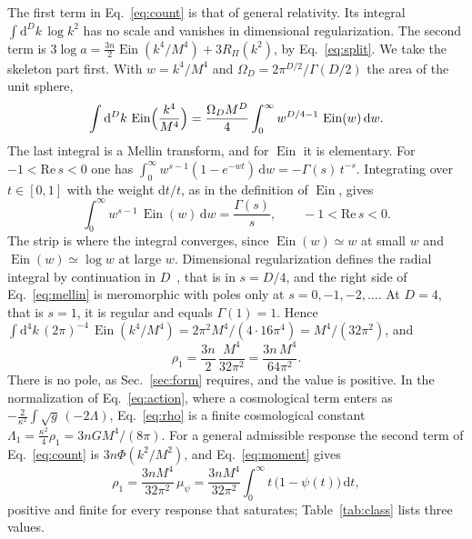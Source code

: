 \documentclass[a4paper,11pt]{article}
\newcommand{\dd}{\mathrm{d}}
\newcommand{\Ein}{\operatorname{Ein}}
\begin{document}
The first term in Eq.~\eqref{eq:count} is that of general relativity. Its integral $\int\dd^Dk\,\log k^2$ has no scale and vanishes in dimensional regularization. The second term is $3\log a=\frac{3n}2\Ein(k^4/M^4)+3R_\Pi(k^2)$, by Eq.~\eqref{eq:split}. We take the skeleton part first. With $w=k^4/M^4$ and $\Omega_D=2\pi^{D/2}/\Gamma(D/2)$ the area of the unit sphere,
\[
\int\dd^Dk\,\Ein\Bigl(\frac{k^4}{M^4}\Bigr)=\frac{\Omega_DM^D}4\int_0^\infty w^{D/4-1}\,\Ein(w)\,\dd w .
\]
The last integral is a Mellin transform, and for $\Ein$ it is elementary. For $-1<\mathrm{Re}\,s<0$ one has $\int_0^\infty w^{s-1}(1-e^{-wt})\,\dd w=-\Gamma(s)\,t^{-s}$. Integrating over $t\in[0,1]$ with the weight $\dd t/t$, as in the definition of $\Ein$, gives
\begin{equation}
\label{eq:mellin}
\int_0^\infty w^{s-1}\,\Ein(w)\,\dd w=\frac{\Gamma(s)}{s},\qquad -1<\mathrm{Re}\,s<0 .
\end{equation}
The strip is where the integral converges, since $\Ein(w)\simeq w$ at small $w$ and $\Ein(w)\simeq\log w$ at large $w$. Dimensional regularization defines the radial integral by continuation in $D$~\cite{Collins1984}, that is in $s=D/4$, and the right side of Eq.~\eqref{eq:mellin} is meromorphic with poles only at $s=0,-1,-2,\dots$. At $D=4$, that is $s=1$, it is regular and equals $\Gamma(1)=1$. Hence $\int\dd^4k\,(2\pi)^{-4}\,\Ein(k^4/M^4)=2\pi^2M^4/(4\cdot16\pi^4)=M^4/(32\pi^2)$, and
\begin{equation}
\label{eq:rho}
\rho_1=\frac{3n}{2}\,\frac{M^4}{32\pi^2}=\frac{3n\,M^4}{64\pi^2}.
\end{equation}
There is no pole, as Sec.~\ref{sec:form} requires, and the value is positive. In the normalization of Eq.~\eqref{eq:action}, where a cosmological term enters as $-\frac2{\kappa^2}\int\sqrt g\,(-2\Lambda)$, Eq.~\eqref{eq:rho} is a finite cosmological constant $\Lambda_1=\frac{\kappa^2}4\rho_1=3nGM^4/(8\pi)$. For a general admissible response the second term of Eq.~\eqref{eq:count} is $3n\Phi(k^2/M^2)$, and Eq.~\eqref{eq:moment} gives
\begin{equation}
\label{eq:rho-gen}
\rho_1=\frac{3nM^4}{32\pi^2}\,\mu_\psi=\frac{3nM^4}{32\pi^2}\int_0^\infty t\,\bigl(1-\psi(t)\bigr)\,\dd t ,
\end{equation}
positive and finite for every response that saturates; Table~\ref{tab:class} lists three values.
\end{document}

